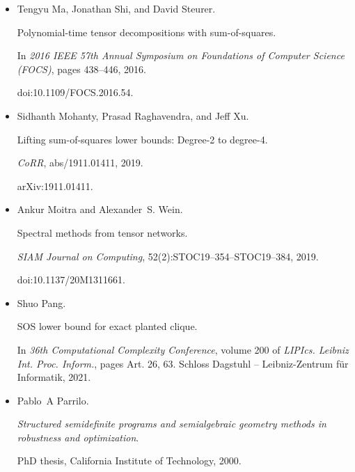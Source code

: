 \documentclass[10pt,a4paper]{article}
\begin{document}
\begin{itemize}
\item[] 
[34]

Tengyu Ma, Jonathan Shi, and David Steurer.


Polynomial-time tensor decompositions with sum-of-squares.


In \emph{2016 IEEE 57th Annual Symposium on Foundations of Computer
Science (FOCS)}, pages 438–446, 2016.


doi:10.1109/FOCS.2016.54.





\item[] 
[35]

Sidhanth Mohanty, Prasad Raghavendra, and Jeff Xu.


Lifting sum-of-squares lower bounds: Degree-2 to degree-4.


\emph{CoRR}, abs/1911.01411, 2019.


arXiv:1911.01411.





\item[] 
[36]

Ankur Moitra and Alexander S. Wein.


Spectral methods from tensor networks.


\emph{SIAM Journal on Computing}, 52(2):STOC19–354–STOC19–384,
2019.


doi:10.1137/20M1311661.





\item[] 
[37]

Shuo Pang.


SOS lower bound for exact planted clique.


In \emph{36th Computational Complexity Conference}, volume 200
of \emph{LIPIcs. Leibniz Int. Proc. Inform.}, pages Art. 26, 63. Schloss
Dagstuhl – Leibniz-Zentrum für Informatik, 2021.





\item[] 
[38]

Pablo A Parrilo.


\emph{Structured semidefinite programs and semialgebraic geometry
methods in robustness and optimization}.


PhD thesis, California Institute of Technology, 2000.






\end{itemize}
\end{document}
